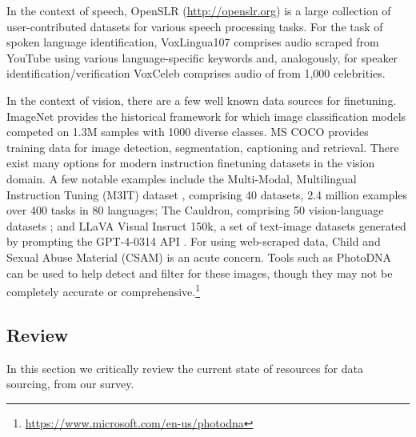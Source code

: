 In the context of speech, OpenSLR (\url{http://openslr.org}) is a large collection of user-contributed datasets for various speech processing tasks. For the task of spoken language identification, VoxLingua107 \citep{valk2021voxlingua107} comprises audio scraped from YouTube using various language-specific keywords and, analogously, for speaker identification/verification VoxCeleb \citep{nagrani17-interspeech} comprises audio of from 1,000 celebrities.

In the context of vision, there are a few well known data sources for finetuning.
ImageNet \citep{5206848} provides the historical framework for which image classification models competed on 1.3M samples with 1000 diverse classes.
MS COCO \citep{lin2014microsoft} provides training data for image detection, segmentation, captioning and retrieval.
There exist many options for modern instruction finetuning datasets in the vision domain.
A few notable examples include the Multi-Modal, Multilingual Instruction Tuning (M3IT) dataset \citep{li2023m}, comprising 40 datasets, 2.4 million examples over 400 tasks in 80 languages; The Cauldron, comprising 50 vision-language datasets \citep{laurenccon2024matters}; and LLaVA Visual Insruct 150k, a set of text-image datasets generated by prompting the GPT-4-0314 API \citep{liu2024visual}.
For using web-scraped data, Child and Sexual Abuse Material (CSAM) is an acute concern. Tools such as PhotoDNA can be used to help detect and filter for these images, though they may not be completely accurate or comprehensive.\footnote{\url{https://www.microsoft.com/en-us/photodna}}


% 

\subsection{Review}
\label{sec:data-review}

In this section we critically review the current state of resources for data sourcing, from our survey. 

